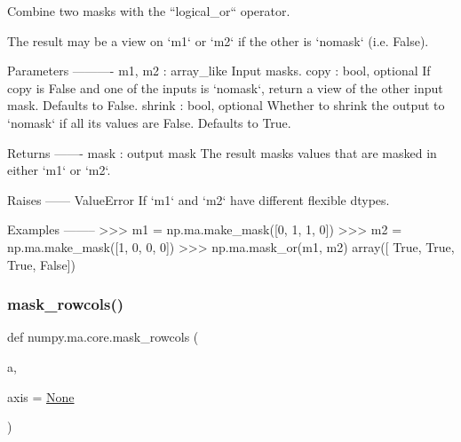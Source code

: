 \begin{DoxyVerb}Combine two masks with the ``logical_or`` operator.

The result may be a view on `m1` or `m2` if the other is `nomask`
(i.e. False).

Parameters
----------
m1, m2 : array_like
    Input masks.
copy : bool, optional
    If copy is False and one of the inputs is `nomask`, return a view
    of the other input mask. Defaults to False.
shrink : bool, optional
    Whether to shrink the output to `nomask` if all its values are
    False. Defaults to True.

Returns
-------
mask : output mask
    The result masks values that are masked in either `m1` or `m2`.

Raises
------
ValueError
    If `m1` and `m2` have different flexible dtypes.

Examples
--------
>>> m1 = np.ma.make_mask([0, 1, 1, 0])
>>> m2 = np.ma.make_mask([1, 0, 0, 0])
>>> np.ma.mask_or(m1, m2)
array([ True,  True,  True, False])\end{DoxyVerb}
 \mbox{\label{namespacenumpy_1_1ma_1_1core_a7c5ee17b330cd52d1a752132d6987e60}} 
\subsubsection{\texorpdfstring{mask\+\_\+rowcols()}{mask\_rowcols()}}
{\footnotesize\ttfamily def numpy.\+ma.\+core.\+mask\+\_\+rowcols (\begin{DoxyParamCaption}\item[{}]{a,  }\item[{}]{axis = {\ttfamily \hyperlink{namespacenumpy_1_1ma_1_1core_a647ee1848dfa3692fe35a663a2aa40b3}{None}} }\end{DoxyParamCaption})}


